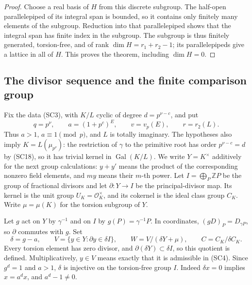 \begin{proof}
Choose a real basis of $H$ from this discrete subgroup.
The half-open parallelepiped of its integral span is
bounded, so it contains only finitely many elements of
the subgroup.  Reduction into that parallelepiped shows
that the integral span has finite index in the subgroup.
The subgroup is thus finitely generated, torsion-free,
and of rank $\dim H=r_1+r_2-1$; its parallelepipeds
give a lattice in all of $H$.  This proves the theorem,
including $\dim H=0$.
\end{proof}

\subsection{The divisor sequence and the finite comparison group}

Fix the data (SC3), with $K/L$ cyclic of degree
$d=p^{\nu-c}$, and put
\[
 q=p^\nu,\qquad a=(1+p^c)^E,\qquad
 v=v_p(E),\qquad r=r_2(L).
\]
Thus $a>1$, $a\equiv1\pmod p$, and $L$ is totally imaginary.
The hypotheses also imply $K=L(\mu_{p^\nu})$:
the restriction of $\gamma$ to the primitive root has order
$p^{\nu-c}=d$ by (SC18), so it has trivial kernel in
$\operatorname{Gal}(K/L)$.
We write $Y=K^\times$ additively for the next group calculations:
$y+y'$ means the product of the corresponding nonzero field
elements, and $my$ means their $m$-th power.
Let $I=\bigoplus_P\mathbb Z P$ be the group of fractional
divisors and let $\partial:Y\to I$ be the principal-divisor
map.  Its kernel is the unit group $U_K=\mathcal O_K^\times$,
and its cokernel is the ideal class group $C_K$.
Write $\mu=\mu(K)$ for the torsion subgroup of $Y$.

Let $g$ act on $Y$ by $\gamma^{-1}$ and on $I$ by
$g(P)=\gamma^{-1}P$.  In coordinates,
$(gD)_P=D_{\gamma P}$, so $\partial$ commutes with $g$.
Set
\[
 \delta=g-a,\qquad
 V=\{y\in Y:\partial y\in\delta I\},\qquad
 W=V/(\delta Y+\mu),\qquad
 C=C_K/\delta C_K .
 \tag{SU1}
\]
Every torsion element has zero divisor, and
$\partial(\delta Y)\subset\delta I$, so this quotient is defined.
Multiplicatively, $y\in V$ means exactly that it is admissible
in (SC4).  Since $g^d=1$ and $a>1$, $\delta$ is injective on
the torsion-free group $I$.  Indeed $\delta x=0$ implies
$x=a^dx$, and $a^d-1\ne0$.

